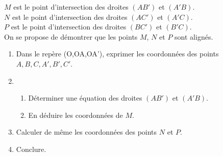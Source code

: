 $M$ est le point d'intersection des droites $(AB')$ et $(A'B)$. \\
$N$ est le point d'intersection des droites $(AC')$ et $(A'C)$.\\
$P$ est le point d'intersection des droites $(BC')$ et $(B'C)$.\\

On se propose de démontrer que les points $M$, $N$ et $P$ sont alignés.

\begin{enumerate}
\item Dans le repère (O,OA,OA'), exprimer les coordonnées des points $A, B, C, A', B', C'$.
\item \begin{enumerate}
\item Déterminer une équation des droites $(AB')$ et $(A'B)$.
\item En déduire les coordonnées de $M$.
\end{enumerate}
\item Calculer de même les coordonnées des points $N$ et $P$.
\item Conclure.
\end{enumerate}